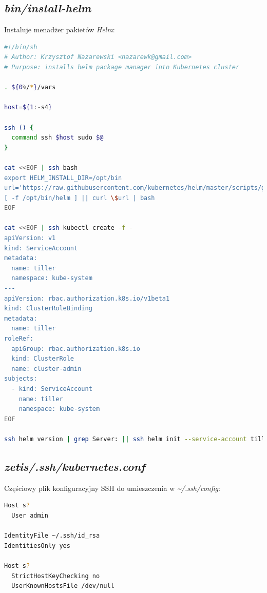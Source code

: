 \documentclass[a4paper,12pt,twoside,openany]{report}
\begin{document}
\newpage

\hypertarget{bininstall-helm}{%
\subsection{\texorpdfstring{\emph{bin/install-helm}}{bin/install-helm}}\label{bininstall-helm}}

Instaluje menadżer pakietów \emph{Helm}:

\begin{lstlisting}[language=bash]
#!/bin/sh
# Author: Krzysztof Nazarewski <nazarewk@gmail.com>
# Purpose: installs helm package manager into Kubernetes cluster

. ${0%/*}/vars

host=${1:-s4}

ssh () {
  command ssh $host sudo $@
}

cat <<EOF | ssh bash
export HELM_INSTALL_DIR=/opt/bin
url='https://raw.githubusercontent.com/kubernetes/helm/master/scripts/get'
[ -f /opt/bin/helm ] || curl \$url | bash
EOF

cat <<EOF | ssh kubectl create -f -
apiVersion: v1
kind: ServiceAccount
metadata:
  name: tiller
  namespace: kube-system
---
apiVersion: rbac.authorization.k8s.io/v1beta1
kind: ClusterRoleBinding
metadata:
  name: tiller
roleRef:
  apiGroup: rbac.authorization.k8s.io
  kind: ClusterRole
  name: cluster-admin
subjects:
  - kind: ServiceAccount
    name: tiller
    namespace: kube-system
EOF

ssh helm version | grep Server: || ssh helm init --service-account tiller
\end{lstlisting}

\hypertarget{zetis.sshkubernetes.conf}{%
\subsection{\texorpdfstring{\emph{zetis/.ssh/kubernetes.conf}}{zetis/.ssh/kubernetes.conf}}\label{zetis.sshkubernetes.conf}}

Częściowy plik konfiguracyjny SSH do umieszczenia w
\emph{\textasciitilde{}/.ssh/config}:

\begin{lstlisting}[language=bash]
Host s?
  User admin

IdentityFile ~/.ssh/id_rsa
IdentitiesOnly yes

Host s?
  StrictHostKeyChecking no
  UserKnownHostsFile /dev/null
\end{lstlisting}
\end{document}
